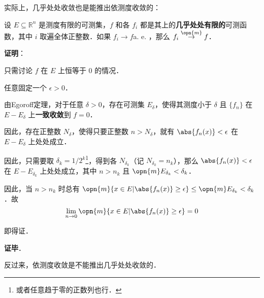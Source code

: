 实际上，几乎处处收敛也是能推出依测度收敛的：

\begin{theorem}{}\label{LimMs_the1}

设 $E\subseteq \mathbb{R}^n$ 是测度有限的可测集，$f$ 和各 $f_i$ 都是其上的\textbf{几乎处处有限的}可测函数，其中 $i$ 取遍全体正整数．如果 $f_i\to f $a. e. ，那么 $f_i\overset{\opn{m}}\to f$．



\end{theorem}

\textbf{证明}：

只需讨论 $f$ 在 $E$ 上恒等于 $0$ 的情况．

任意固定一个 $\epsilon>0$．

由Egoroff定理，对于任意 $\delta>0$，存在可测集 $E_\delta$，使得其测度小于 $\delta$ 且 $\{f_n\}$ 在 $E-E_\delta$ 上\textbf{一致收敛}到 $f=0$．

因此，存在正整数 $N_\delta$，使得只要正整数 $n>N_\delta$，就有 $\abs{f_n(x)}<\epsilon$ 在 $E-E_\delta$ 上处处成立．

因此，只需要取 $\delta_k=1/2^k$\footnote{或者任意趋于零的正数列也行．}，得到各 $N_{\delta_k}$（记 $N_{\delta_k}=n_k$），那么 $\abs{f_{n}(x)}<\epsilon$ 在 $E-E_{\delta_k}$ 上处处成立，其中 $n>n_k$ 且 $\opn{m}E_{\delta_k}<{\delta_k}$．

因此，当 $n>n_k$ 时总有 $\opn{m}\{x\in E|\abs{f_n(x)}\geq\epsilon\}\leq\opn{m}E_{\delta_k}<\delta_k$．故
\begin{equation}
\lim\limits_{n\to 0}\opn{m}\{x\in E|\abs{f_n(x)}\geq\epsilon\}=0
\end{equation}

即得证．

\textbf{证毕}．


反过来，依测度收敛是不能推出几乎处处收敛的．

